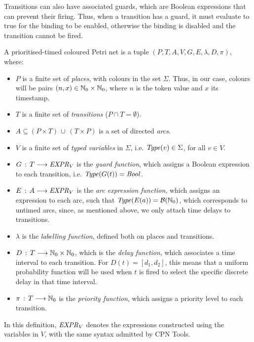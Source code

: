 Transitions can also have associated guards, which
are Boolean expressions that can prevent their firing.
Thus, when a transition has a guard, it must evaluate to
true for the binding to be enabled,
otherwise the binding is disabled and 
the transition cannot be fired. 

\begin{definition} 
A prioritised-timed coloured Petri net is a tuple $(P,T,A,V,G,E,\lambda,D,\pi)$, where: %
\begin{itemize}
\item $P$ is a finite set of {\em places}, with colours
in the set $\Sigma$. Thus, in our case, colours 
will be pairs $(n,x)\in \mathbb{N}_{0} \times \mathbb{N}_{0}$, where $n$ is
the token value and $x$ its timestamp.
%
\item $T$ is a finite set of {\em transitions} ($P\cap T = \emptyset$).
%
\item $A \subseteq (P\times T)\,\cup\,(T \times P)$ is a
set of directed {\em arcs}.
%
%
\item $V$ is a finite set of {\em typed variables} in $\Sigma$, 
i.e. ${\it Type}(v) \in \Sigma$, for all $v \in V$.
%
%
\item $G\,:\, T \longrightarrow {\it EXPR}_V$ is the
{\em guard function}, which assigns a Boolean
expression
to each transition, i.e. ${\it Type}(G(t))={\it Bool}$. 
%
\item $E\,:\, A \longrightarrow {\it EXPR}_V$ is the
{\em arc expression function}, which assigns an expression
to each arc, such that ${\it Type}(E(a)) = {\cal B}(\mathbb{N}_{0})$,
which corresponds to untimed arcs, since, as mentioned above,
we only attach time delays to transitions.

\item $\lambda$ is the {\em labelling function}, defined
both on places and transitions.

\item $D\,:\,T \longrightarrow \mathbb{N}_{0} \times \mathbb{N}_{0}$, which
is the {\em delay function}, which associates a time
interval to each transition. For $D(t)=[d_1,d_2]$,
this means that a uniform probability function will
be used when $t$ is fired to select the specific discrete
delay in that time interval.
%
\item $\pi\,:\,T \longrightarrow \mathbb{N}_{0}$ is the
{\em priority function}, which assigns a priority level
to each transition. 
\end{itemize}

In this definition, ${\it EXPR}_V$ denotes the
expressions constructed using the variables in $V$,
with the same syntax admitted by CPN Tools.
\end{definition}

